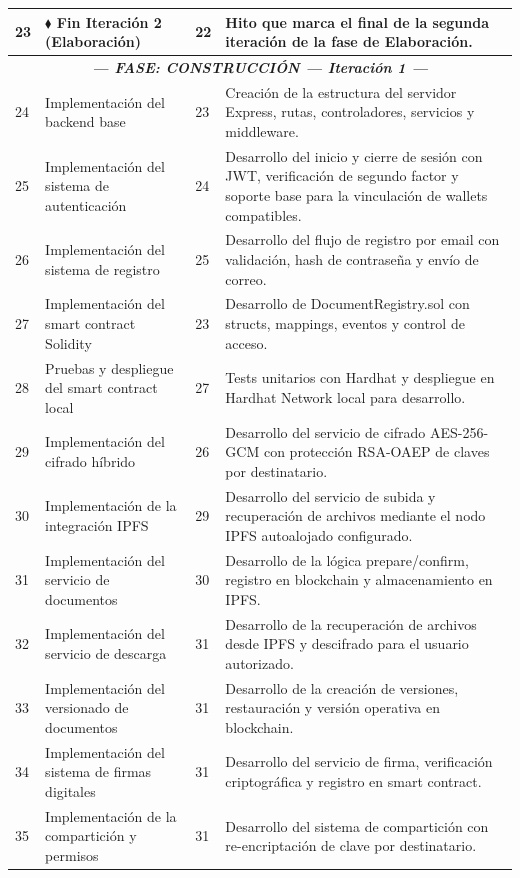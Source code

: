 \documentclass[11pt, a4paper]{article}
\begin{document}
\begin{longtable}{|p{1cm}|p{5.5cm}|p{1.5cm}|p{5.5cm}|}
\hline
23 & \textbf{$\blacklozenge$ Fin Iteración 2 (Elaboración)} & 22 & Hito que marca el final de la segunda iteración de la fase de Elaboración. \\
\hline
\multicolumn{4}{|c|}{\textit{\textbf{--- FASE: CONSTRUCCIÓN --- Iteración 1 ---}}} \\
\hline
24 & Implementación del backend base & 23 & Creación de la estructura del servidor Express, rutas, controladores, servicios y middleware. \\
\hline
25 & Implementación del sistema de autenticación & 24 & Desarrollo del inicio y cierre de sesión con JWT, verificación de segundo factor y soporte base para la vinculación de wallets compatibles. \\
\hline
26 & Implementación del sistema de registro & 25 & Desarrollo del flujo de registro por email con validación, hash de contraseña y envío de correo. \\
\hline
27 & Implementación del smart contract Solidity & 23 & Desarrollo de DocumentRegistry.sol con structs, mappings, eventos y control de acceso. \\
\hline
28 & Pruebas y despliegue del smart contract local & 27 & Tests unitarios con Hardhat y despliegue en Hardhat Network local para desarrollo. \\
\hline
29 & Implementación del cifrado híbrido & 26 & Desarrollo del servicio de cifrado AES-256-GCM con protección RSA-OAEP de claves por destinatario. \\
\hline
30 & Implementación de la integración IPFS & 29 & Desarrollo del servicio de subida y recuperación de archivos mediante el nodo IPFS autoalojado configurado. \\
\hline
31 & Implementación del servicio de documentos & 30 & Desarrollo de la lógica prepare/confirm, registro en blockchain y almacenamiento en IPFS. \\
\hline
32 & Implementación del servicio de descarga & 31 & Desarrollo de la recuperación de archivos desde IPFS y descifrado para el usuario autorizado. \\
\hline
33 & Implementación del versionado de documentos & 31 & Desarrollo de la creación de versiones, restauración y versión operativa en blockchain. \\
\hline
34 & Implementación del sistema de firmas digitales & 31 & Desarrollo del servicio de firma, verificación criptográfica y registro en smart contract. \\
\hline
35 & Implementación de la compartición y permisos & 31 & Desarrollo del sistema de compartición con re-encriptación de clave por destinatario. \\

\end{longtable}
\end{document}

